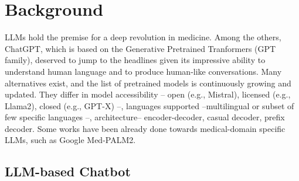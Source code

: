 \documentclass[preprint,12pt]{elsarticle}
\begin{document}
\section{Background}\label{sec:back}

LLMs hold the premise for a deep revolution in medicine. 
%
Among the others, ChatGPT, which is based on the Generative Pretrained Tranformers (GPT family), deserved to jump to the headlines given its impressive ability to understand human language and to produce human-like conversations.
%
Many alternatives exist, and the list of pretrained models is continuously growing and updated.
%
They differ in model accessibility -- open (e.g., Mistral), licensed (e.g., Llama2), closed (e.g., GPT-X) --, languages supported --multilingual or subset of few specific languages --, architecture-- encoder-decoder, casual decoder, prefix decoder.
%
Some works have been already done towards medical-domain specific LLMs, such as Google Med-PALM2.

\subsection{LLM-based Chatbot}
\end{document}

